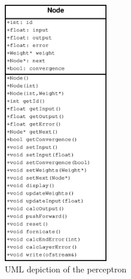 \begin{figure}[h]
\centering
\includegraphics[width={0.4\textwidth}]{pictures/uml_node}
\caption{UML depiction of the perceptron}
\label{fig:uml_node}
\end{figure}

